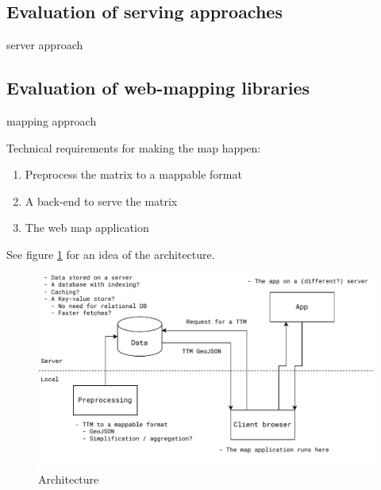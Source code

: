 \subsection{Evaluation of serving approaches}
server approach

\subsection{Evaluation of web-mapping libraries}
mapping approach

Technical requirements for making the map happen:
\begin{enumerate}
	\item Preprocess the matrix to a mappable format
	\item A back-end to serve the matrix
	\item The web map application
\end{enumerate}

See figure \ref{fig:architechture} for an idea of the architecture.

\begin{figure}[H]
	\centering
	\includegraphics[width=1\textwidth]{images/architechture}
	\caption{Architecture}
	\label{fig:architechture}
\end{figure}



